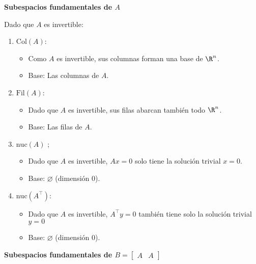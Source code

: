 \begin{enumerate}[label=\color{red}\textbf{\arabic*)}]
    \textbf{Subespacios fundamentales de $A$}

    Dado que $A$ es invertible:
    \begin{enumerate}[label=\arabic*)]
        \item $\mathrm{Col}(A)$:
            \begin{itemize}[label=\textbullet]
                \item Como $A$ es invertible, sus columnas forman una base de $\R^n$.
                \item Base: Las columnas de $A$.
            \end{itemize}
        \item $\mathrm{Fil}(A)$:
            \begin{itemize}[label=\textbullet]
                \item Dado que $A$ es invertible, sus filas abarcan también todo  $\R^n$.
                \item Base: Las filas de $A$.
            \end{itemize}
        \item $\mathrm{nuc}(A)$ ;
            \begin{itemize}[label=\textbullet]
                \item Dado que $A$ es invertible,  $Ax=0$ solo tiene la solución trivial  $x=0$.
                \item Base:  $\varnothing$ (dimensión 0).
            \end{itemize}
        \item $\mathrm{nuc}(A^\intercal)$:
            \begin{itemize}[label=\textbullet]
                \item Dado que $A$ es invertible,  $A^\intercal y=0$ también tiene solo la solución trivial $y=0$ 
                \item Base:  $\varnothing$ (dimensión 0).
            \end{itemize}
    \end{enumerate}
    \textbf{Subespacios fundamentales de $B=\begin{bmatrix} 
            A & A 
    \end{bmatrix} $} 


\end{enumerate}
